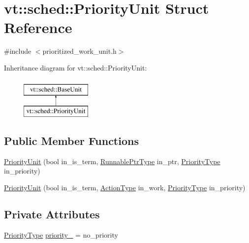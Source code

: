 \hypertarget{structvt_1_1sched_1_1_priority_unit}{}\section{vt\+:\+:sched\+:\+:Priority\+Unit Struct Reference}
\label{structvt_1_1sched_1_1_priority_unit}


{\ttfamily \#include $<$prioritized\+\_\+work\+\_\+unit.\+h$>$}

Inheritance diagram for vt\+:\+:sched\+:\+:Priority\+Unit\+:\begin{figure}[H]
\begin{center}
\leavevmode
\includegraphics[height=2.000000cm]{structvt_1_1sched_1_1_priority_unit}
\end{center}
\end{figure}
\subsection*{Public Member Functions}
\begin{DoxyCompactItemize}
\item 
\hyperlink{structvt_1_1sched_1_1_priority_unit_ae8a2706424c4e84db8be30fe59c21718}{Priority\+Unit} (bool in\+\_\+is\+\_\+term, \hyperlink{structvt_1_1sched_1_1_base_unit_a9be5d5adaeb011c8ef82f751485ebf9a}{Runnable\+Ptr\+Type} in\+\_\+ptr, \hyperlink{namespacevt_a86bff9f556eb761b27fc8600d006ac04}{Priority\+Type} in\+\_\+priority)
\item 
\hyperlink{structvt_1_1sched_1_1_priority_unit_aeea5316b975f9c1bde33a5cc3dfb1631}{Priority\+Unit} (bool in\+\_\+is\+\_\+term, \hyperlink{namespacevt_ae0a5a7b18cc99d7b732cb4d44f46b0f3}{Action\+Type} in\+\_\+work, \hyperlink{namespacevt_a86bff9f556eb761b27fc8600d006ac04}{Priority\+Type} in\+\_\+priority)
\end{DoxyCompactItemize}
\subsection*{Private Attributes}
\begin{DoxyCompactItemize}
\item 
\hyperlink{namespacevt_a86bff9f556eb761b27fc8600d006ac04}{Priority\+Type} \hyperlink{structvt_1_1sched_1_1_priority_unit_ad8f7fe9067612b7902a6258f3260cfac}{priority\+\_\+} = no\+\_\+priority
\end{DoxyCompactItemize}
